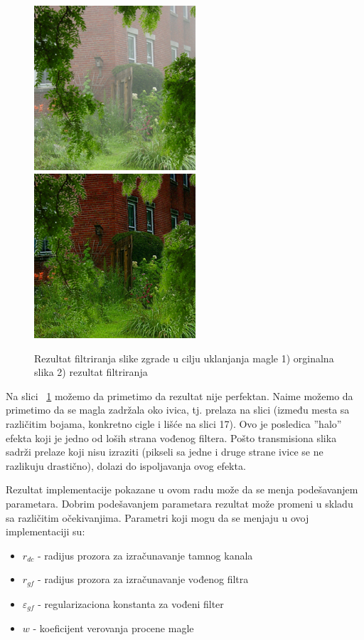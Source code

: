 \documentclass[a4paper,12pt,titlepage]{article}
\begin{document}
\begin{figure}[ht!]
\centering
\includegraphics[width=60mm]{img/haze.png}
\includegraphics[width=60mm]{img/hazeRes.png}
\caption{Rezultat filtriranja slike zgrade u cilju uklanjanja magle 1) orginalna slika 2) rezultat filtriranja}
\label{dehaze}
\end{figure} 

Na slici ~\ref{dehaze} možemo da primetimo da rezultat nije perfektan. Naime možemo da primetimo da se magla zadržala oko ivica, tj. prelaza na slici (između mesta sa različitim bojama, konkretno cigle i lišće na slici 17). Ovo je posledica ''halo'' efekta koji je jedno od loših strana vođenog filtera. Pošto transmisiona slika sadrži prelaze koji nisu izraziti (pikseli sa jedne i druge strane ivice se ne razlikuju drastično), dolazi do ispoljavanja ovog efekta.

Rezultat implementacije pokazane u ovom radu može da se menja podešavanjem parametara. Dobrim podešavanjem parametara rezultat može promeni u skladu sa različitim očekivanjima. Parametri koji mogu da se menjaju u ovoj implementaciji su:

\newpage
\begin{itemize}
\item $r_{dc}$ - radijus prozora za izračunavanje tamnog kanala 
\item $r_{gf}$ - radijus prozora za izračunavanje vođenog filtra
\item $\varepsilon_{gf}$ - regularizaciona konstanta za vođeni filter 
\item $w$ - koeficijent verovanja procene magle
\end{itemize}
\end{document}
